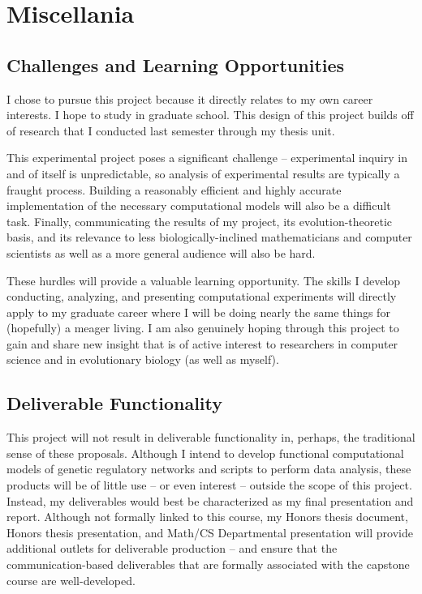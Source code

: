 \section{Miscellania}
\subsection{Challenges and Learning Opportunities}

I chose to pursue this project because it directly relates to my own career interests. I hope to study in graduate school. This design of this project builds off of research that I conducted last semester through my thesis unit. 

This experimental project poses a significant challenge -- experimental inquiry in and of itself is unpredictable, so analysis of experimental results are typically a fraught process. Building a reasonably efficient and highly accurate implementation of the necessary computational models will also be a difficult task. Finally, communicating the results of my project, its evolution-theoretic basis, and its relevance to less biologically-inclined mathematicians and computer scientists as well as a more general audience will also be hard.  

These hurdles will provide a valuable learning opportunity. The skills I develop conducting, analyzing, and presenting computational experiments will directly apply to my graduate career where I will be doing nearly the same things for (hopefully) a meager living. I am also genuinely hoping through this project to gain and share new insight that is of active interest to researchers in computer science and in evolutionary biology (as well as myself).

\subsection{Deliverable Functionality}

This project will not result in deliverable functionality in, perhaps, the traditional sense of these proposals. Although I intend to develop functional computational models of genetic regulatory networks and scripts to perform data analysis, these products will be of little use -- or even interest -- outside the scope of this project. Instead, my deliverables would best be characterized as my final presentation and report. Although not formally linked to this course, my Honors thesis document, Honors thesis presentation, and Math/CS Departmental presentation will provide additional outlets for deliverable production -- and ensure that the communication-based deliverables that are formally associated with the capstone course are well-developed.

